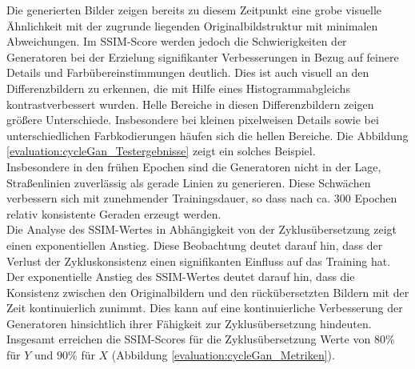 Die generierten Bilder zeigen bereits zu diesem Zeitpunkt eine grobe visuelle Ähnlichkeit mit der zugrunde liegenden Originalbildstruktur mit minimalen Abweichungen. Im SSIM-Score werden jedoch die Schwierigkeiten der Generatoren bei der Erzielung signifikanter Verbesserungen in Bezug auf feinere Details und Farbübereinstimmungen deutlich. Dies ist auch visuell an den Differenzbildern zu erkennen, die mit Hilfe eines Histogrammabgleichs kontrastverbessert wurden. Helle Bereiche in diesen Differenzbildern zeigen größere Unterschiede. Insbesondere bei kleinen pixelweisen Details sowie bei unterschiedlichen Farbkodierungen häufen sich die hellen Bereiche. Die Abbildung \ref{evaluation:cycleGan_Testergebnisse} zeigt ein solches Beispiel.
\\
Insbesondere in den frühen Epochen sind die Generatoren nicht in der Lage, Straßenlinien zuverlässig als gerade Linien zu generieren. Diese Schwächen verbessern sich mit zunehmender Trainingsdauer, so dass nach ca. 300 Epochen relativ konsistente Geraden erzeugt werden.
\\\newline
Die Analyse des SSIM-Wertes in Abhängigkeit von der Zyklusübersetzung zeigt einen exponentiellen Anstieg. Diese Beobachtung deutet darauf hin, dass der Verlust der Zykluskonsistenz einen signifikanten Einfluss auf das Training hat. Der exponentielle Anstieg des SSIM-Wertes deutet darauf hin, dass die Konsistenz zwischen den Originalbildern und den rückübersetzten Bildern mit der Zeit kontinuierlich zunimmt. Dies kann auf eine kontinuierliche Verbesserung der Generatoren hinsichtlich ihrer Fähigkeit zur Zyklusübersetzung hindeuten. Insgesamt erreichen die SSIM-Scores für die Zyklusübersetzung Werte von $80\%$ für $Y$ und $90\%$ für $X$ (Abbildung \ref{evaluation:cycleGan_Metriken}).\\

